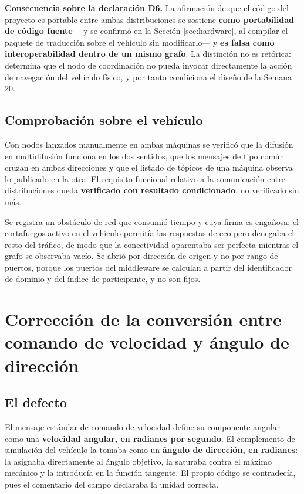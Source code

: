 \documentclass[12pt,letterpaper]{article}
\begin{document}
\textbf{Consecuencia sobre la declaración D6.} La afirmación de que el código del proyecto es portable entre ambas distribuciones se sostiene \textbf{como portabilidad de código fuente} ---y se confirmó en la Sección \ref{sec:hardware}, al compilar el paquete de traducción sobre el vehículo sin modificarlo--- y \textbf{es falsa como interoperabilidad dentro de un mismo grafo}. La distinción no es retórica: determina que el nodo de coordinación no pueda invocar directamente la acción de navegación del vehículo físico, y por tanto condiciona el diseño de la Semana 20.

\subsection{Comprobación sobre el vehículo}

Con nodos lanzados manualmente en ambas máquinas se verificó que la difusión en multidifusión funciona en los dos sentidos, que los mensajes de tipo común cruzan en ambas direcciones y que el listado de tópicos de una máquina observa lo publicado en la otra. El requisito funcional relativo a la comunicación entre distribuciones queda \textbf{verificado con resultado condicionado}, no verificado sin más.

Se registra un obstáculo de red que consumió tiempo y cuya firma es engañosa: el cortafuegos activo en el vehículo permitía las respuestas de eco pero denegaba el resto del tráfico, de modo que la conectividad aparentaba ser perfecta mientras el grafo se observaba vacío. Se abrió por dirección de origen y no por rango de puertos, porque los puertos del middleware se calculan a partir del identificador de dominio y del índice de participante, y no son fijos.

\section{Corrección de la conversión entre comando de velocidad y ángulo de dirección}
\label{sec:ackermann}

\subsection{El defecto}

El mensaje estándar de comando de velocidad define su componente angular como una \textbf{velocidad angular, en radianes por segundo}. El complemento de simulación del vehículo la tomaba como un \textbf{ángulo de dirección, en radianes}: la asignaba directamente al ángulo objetivo, la saturaba contra el máximo mecánico y la introducía en la función tangente. El propio código se contradecía, pues el comentario del campo declaraba la unidad correcta.
\end{document}
